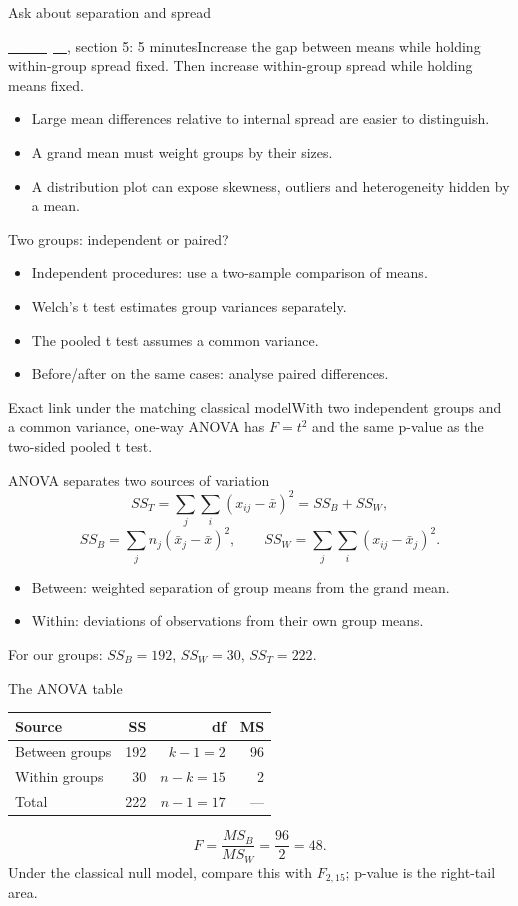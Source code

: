 \begin{frame}{Ask about separation and spread}
\begin{block}{\href{https://silviasaliniunimi.github.io/data-analysis-tax-compliance/04-bivariate.html}{\textcolor{white}{E-tivity 4}}, section 5: 5 minutes}Increase the gap between means while holding within-group spread fixed. Then increase within-group spread while holding means fixed.\end{block}
\begin{itemize}\item Large mean differences relative to internal spread are easier to distinguish.\item A grand mean must weight groups by their sizes.\item A distribution plot can expose skewness, outliers and heterogeneity hidden by a mean.\end{itemize}
\end{frame}
\begin{frame}{Two groups: independent or paired?}
\begin{itemize}\item Independent procedures: use a two-sample comparison of means.\item Welch's t test estimates group variances separately.\item The pooled t test assumes a common variance.\item Before/after on the same cases: analyse paired differences.\end{itemize}
\begin{block}{Exact link under the matching classical model}With two independent groups and a common variance, one-way ANOVA has $F=t^2$ and the same p-value as the two-sided pooled t test.\end{block}
\end{frame}
\begin{frame}{ANOVA separates two sources of variation}
\[
SS_T=\sum_j\sum_i(x_{ij}-\bar x)^2=SS_B+SS_W,
\]
\[
SS_B=\sum_j n_j(\bar x_j-\bar x)^2,\qquad
SS_W=\sum_j\sum_i(x_{ij}-\bar x_j)^2.
\]
\begin{itemize}\item Between: weighted separation of group means from the grand mean.\item Within: deviations of observations from their own group means.\end{itemize}
For our groups: $SS_B=192$, $SS_W=30$, $SS_T=222$.
\end{frame}
\begin{frame}{The ANOVA table}
\begin{center}\begin{tabular}{lrrr}\toprule
Source & SS & df & MS\\\midrule
Between groups & 192 & $k-1=2$ & 96\\
Within groups & 30 & $n-k=15$ & 2\\
Total & 222 & $n-1=17$ & ---\\\bottomrule
\end{tabular}\end{center}
\[
F=\frac{MS_B}{MS_W}=\frac{96}{2}=48.
\]
Under the classical null model, compare this with $F_{2,15}$; p-value is the right-tail area.
\end{frame}
